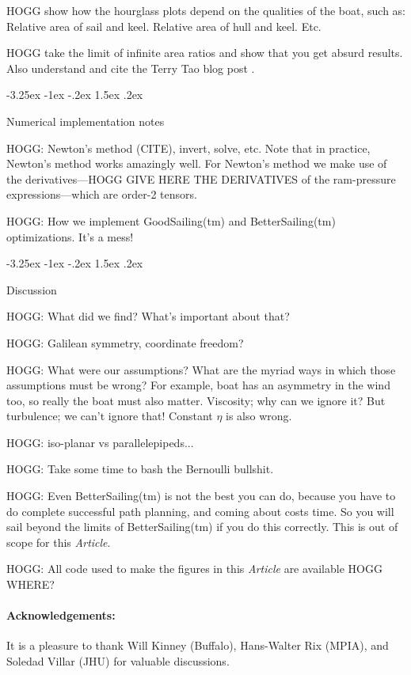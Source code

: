 \documentclass[letterpaper]{article}
\makeatletter
\newcommand{\documentname}{\textsl{Article}}
\renewcommand\section{\@startsection {section}{1}{\z@}%
  {-3.25ex \@plus -1ex \@minus -.2ex}%
  {1.5ex \@plus .2ex}%
  {\raggedright\normalfont\large\bfseries}}
\makeatother
\begin{document}
HOGG show how the hourglass plots depend on the qualities of the boat, such as: Relative area of sail and keel. Relative area of hull and keel. Etc.

HOGG take the limit of infinite area ratios and show that you get absurd results. Also understand and cite the Terry Tao blog post \cite{tao}.

\section{Numerical implementation notes}\label{sec:implementation}

HOGG: Newton's method (CITE), invert, solve, etc.
Note that in practice, Newton's method works amazingly well.
For Newton's method we make use of the derivatives---HOGG GIVE HERE THE DERIVATIVES of the ram-pressure expressions---which are order-2 tensors.

HOGG: How we implement GoodSailing(tm) and BetterSailing(tm) optimizations. It's a mess!

\section{Discussion}\label{sec:discussion}

HOGG: What did we find? What's important about that?

HOGG: Galilean symmetry, coordinate freedom?

HOGG: What were our assumptions? What are the myriad ways in which those assumptions must be wrong? For example, boat has an asymmetry in the wind too, so really the boat must also matter. Viscosity; why can we ignore it? But turbulence; we can't ignore that! Constant $\eta$ is also wrong.

HOGG: iso-planar vs parallelepipeds...

HOGG: Take some time to bash the Bernoulli bullshit.

HOGG: Even BetterSailing(tm) is not the best you can do, because you have to do complete successful path planning, and coming about costs time. So you will sail beyond the limits of BetterSailing(tm) if you do this correctly. This is out of scope for this \documentname.

HOGG: All code used to make the figures in this \documentname{} are available HOGG WHERE?

\paragraph{Acknowledgements:}
It is a pleasure to thank Will Kinney (Buffalo), Hans-Walter Rix (MPIA), and Soledad Villar (JHU) for valuable discussions.

\footnotesize


\end{document}
